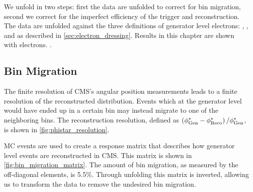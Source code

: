 We unfold in two steps: first the data are unfolded to correct for bin
migration, second we correct for the imperfect efficiency of the trigger and
reconstruction. The data are unfolded against the three definitions of
generator level electrons: \born, \dressed, and \bare as described in
\cref{sec:electron_dressing}. Results in this chapter are shown with
\dressed electrons. .

\subsection{Bin Migration}
\label{ssec:bin_migration}

The finite resolution of CMS's angular position measurements leads to a finite
resolution of the reconstructed \phistar distribution. Events which at the
generator level would have ended up in a certain \phistar bin may instead
migrate to one of the neighboring bins. The \phistar reconstruction resolution,
defined as $\left( \phi^{*}_{\text{Gen}} - \phi^{*}_{\text{Reco}} \right) / \phi^{*}_{\text{Gen}}$, is shown
in \cref{fig:phistar_resolution}.

MC events are used to create a response matrix that describes how generator
level events are reconstructed in CMS. This matrix is shown in
\cref{fig:bin_migration_matrix}. The amount of bin migration, as measured
by the off-diagonal elements, is 5.5\%. Through unfolding this matrix is
inverted, allowing us to transform the data to remove the undesired bin
migration.

